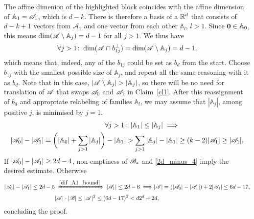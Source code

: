\begin{enumerate}
            The affine dimenion of the highlighted block coincides with the affine dimension of $\mathbb{A}_1={\mathscr{A}}_1$, which is $d-k$. There is therefore a basis of a ${\mathbb{R}}^d$ that consists of $d-k+1$ vectors from $\mathcal{A}_1$ and one vector from each other $\mathbb{A}_l$, $l>1$. Since $\mathbf{0} \in \mathbb{A}_0$, this means $\operatorname{dim}({\mathscr{A}}\setminus \mathbb{A}_j)=d-1$ for all $j>1$. We thus have
            \begin{equation*}
                \forall j>1\!:\;\operatorname{dim}({\mathscr{A}}\cap b_{1j}^\bot) = \operatorname{dim}({\mathscr{A}}\setminus\mathbb{A}_j) = d-1,
            \end{equation*}  
            which means that, indeed, any of the $b_{1j}$ could be set as $b_d$ from the start. Choose $b_{1j}$ with the smallest possible size of $\mathbb{A}_j$, and repeat all the same reasoning with it as $b_d$. Note that in this case, $\left|\aaa\setminus\mathbb{A}_j\right|>\left|\mathbb{A}_j\right|$, so there will be no need for translation of ${\mathscr{A}}$ that swaps ${\mathscr{A}}_0$ and ${\mathscr{A}}_1$ in Claim~\ref{cl1}. After this reassignment of $b_d$ and appropriate relabeling of families $\mathbb{A}_l$, we may assume that $|\mathbb{A}_j|$, among positive $j$, is minimised by $j=1$.
            \begin{align}
                \forall j>1\!:\:|\mathbb{A}_1| \leq |\mathbb{A}_j|\; \Longrightarrow & \nonumber\\   |{\mathscr{A}}_0|-|{\mathscr{A}}_1| = \biggl(|\mathbb{A}_0|+\sum_{j>1}|\mathbb{A}_j|\biggr) - |\mathbb{A}_1| > \sum_{j>1}|\mathbb{A}_j| - |\mathbb{A}_1| & \geq(k-2)|{\mathscr{A}}_1| \geq |{\mathscr{A}}_1|.\label{dif_A1_bound}
            \end{align} 
            If $\left|{\mathscr{A}}_0\right|-\left|{\mathscr{A}}_1\right|\geq2d-4$, non-emptiness of ${\mathscr{B}}_*$ and \eqref{2d_minus_4} imply the desired estimate. Otherwise
            \begin{align*}
                |{\mathscr{A}}_0|-|{\mathscr{A}}_1| \leq 2d-5 & \;\xRightarrow{\eqref{dif_A1_bound}}\; |{\mathscr{A}}_1| \leq 2d - 6\;\Longrightarrow |{\mathscr{A}}| = (|{\mathscr{A}}_0|-|{\mathscr{A}}_1|) + 2|{\mathscr{A}}_1| \leq 6d-17, \\
                &|{\mathscr{A}}|\cdot|{\mathscr{B}}| \leq |{\mathscr{A}}|^2 \leq (6d-17)^2 < d 2^d + 2d,
            \end{align*}
            concluding the proof.
        \end{enumerate}

